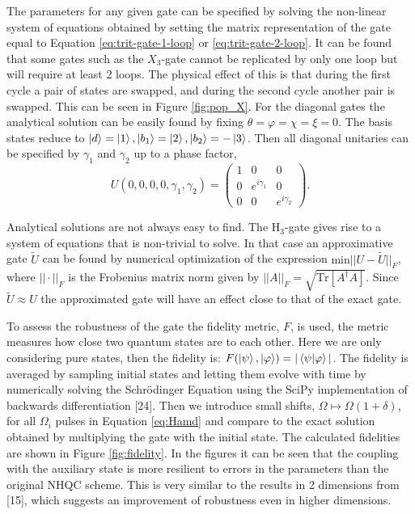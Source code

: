 The parameters for any given gate can be specified by solving the non-linear system of equations obtained by setting the matrix representation of the gate equal to Equation \ref{eq:trit-gate-1-loop} or \ref{eq:trit-gate-2-loop}. It can be found that some gates such as the $X_3$-gate cannot be replicated by only one loop but will require at least 2 loops. The physical effect of this is that during the first cycle a pair of states are swapped, and during the second cycle another pair is swapped. This can be seen in Figure \ref{fig:pop_X}. For the diagonal gates the analytical solution can be easily found by fixing $\theta = \varphi = \chi = \xi = 0$. The basis states reduce to $\ket{d} = \ket{1}, \ket{b_1} = \ket{2}, \ket{b_2} = -\ket{3}$. Then all diagonal unitaries can be specified by $\gamma_1$ and $\gamma_2$ up to a phase factor,
\begin{equation}
U(0,0,0,0,\gamma_1,\gamma_2) = \begin{pmatrix}
1&0&0
\\
0&e^{i\gamma_1}&0
\\
0&0&e^{i\gamma_2}
\end{pmatrix}.
\end{equation}

Analytical solutions are not always easy to find. The H$_3$-gate gives rise to a system of equations that is non-trivial to solve. 
In that case an approximative gate $\tilde{U}$ can be found by numerical optimization of the expression $\text{min}||U-\tilde{U}||_F$, where $||\cdot||_F$ is the Frobenius matrix norm given by $||A||_F = \sqrt{\text{Tr}\left[A^\dagger A \right]}$. Since $\tilde{U} \approx U$ the approximated gate will have an effect close to that of the exact gate.

To assess the robustness of the gate the fidelity metric, $F$, is used, the metric measures how close two quantum states are to each other. Here we are only considering pure states, then the fidelity is: $F(\ket{\psi},\ket{\varphi}) = |\bra{\psi}\ket{\varphi}|$. The fidelity is averaged by sampling initial states and letting them evolve with time by numerically solving the Schrödinger Equation using the SciPy implementation of backwards differentiation [24]. Then we introduce small shifts, $\Omega \mapsto \Omega(1 + \delta)$, for all $\Omega_i$ pulses in Equation \ref{eq:Hamd} and compare to the exact solution obtained by multiplying the gate with the initial state. The calculated fidelities are shown in Figure \ref{fig:fidelity}. In the figures it can be seen that the coupling with the auxiliary state is more resilient to errors in the parameters than the original NHQC scheme. This is very similar to the results in 2 dimensions from [15], which suggests an improvement of robustness even in higher dimensions.

